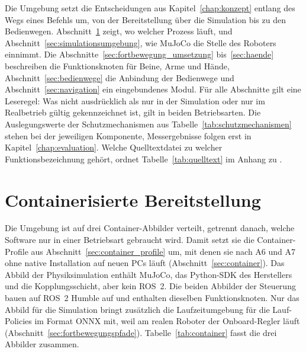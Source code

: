 
Die Umgebung setzt die Entscheidungen aus Kapitel~\ref{chap:konzept} entlang des Wegs eines Befehls um, von der Bereitstellung über die Simulation bis zu den Bedienwegen.
Abschnitt~\ref{sec:bereitstellung} zeigt, wo welcher Prozess läuft, und Abschnitt~\ref{sec:simulationsumgebung}, wie MuJoCo die Stelle des Roboters einnimmt.
Die Abschnitte~\ref{sec:fortbewegung_umsetzung} bis~\ref{sec:haende} beschreiben die Funktionsknoten für Beine, Arme und Hände, Abschnitt~\ref{sec:bedienwege} die Anbindung der Bedienwege und Abschnitt~\ref{sec:navigation} ein eingebundenes Modul.
Für alle Abschnitte gilt eine Leseregel: Was nicht ausdrücklich als nur in der Simulation oder nur im Realbetrieb gültig gekennzeichnet ist, gilt in beiden Betriebsarten.
Die Auslegungswerte der Schutzmechanismen aus Tabelle~\ref{tab:schutzmechanismen} stehen bei der jeweiligen Komponente, Messergebnisse folgen erst in Kapitel~\ref{chap:evaluation}.
Welche Quelltextdatei zu welcher Funktionsbezeichnung gehört, ordnet Tabelle~\ref{tab:quelltext} im Anhang zu .

\section{Containerisierte Bereitstellung}
\label{sec:bereitstellung}
Die Umgebung ist auf drei Container-Abbilder verteilt, getrennt danach, welche Software nur in einer Betriebsart gebraucht wird.
Damit setzt sie die Container-Profile aus Abschnitt~\ref{sec:container_profile} um, mit denen sie nach A6 und A7 ohne native Installation auf neuen PCs läuft (Abschnitt~\ref{sec:container}).
Das Abbild der Physiksimulation enthält MuJoCo, das Python-SDK des Herstellers und die Kopplungsschicht, aber kein ROS~2.
Die beiden Abbilder der Steuerung bauen auf ROS~2 Humble auf und enthalten dieselben Funktionsknoten.
Nur das Abbild für die Simulation bringt zusätzlich die Laufzeitumgebung für die Lauf-Policies im Format ONNX mit, weil am realen Roboter der Onboard-Regler läuft (Abschnitt~\ref{sec:fortbewegungspfade}).
Tabelle~\ref{tab:container} fasst die drei Abbilder zusammen.

